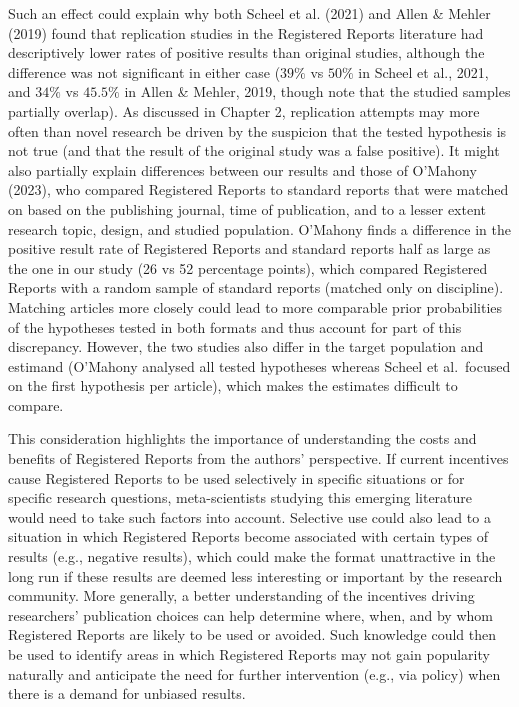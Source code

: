 \documentclass[
  british,
  a4paper,
  ,man,mask,floatsintext]{apa6}
\begin{document}
Such an effect could explain why both Scheel et al. (2021) and Allen \& Mehler (2019) found that replication studies in the Registered Reports literature had descriptively lower rates of positive results than original studies, although the difference was not significant in either case (\(39\%\) vs \(50\%\) in Scheel et al., 2021, and \(34\%\) vs \(45.5\%\) in Allen \& Mehler, 2019, though note that the studied samples partially overlap).
As discussed in Chapter 2, replication attempts may more often than novel research be driven by the suspicion that the tested hypothesis is not true (and that the result of the original study was a false positive).
It might also partially explain differences between our results and those of O'Mahony (2023), who compared Registered Reports to standard reports that were matched on based on the publishing journal, time of publication, and to a lesser extent research topic, design, and studied population.
O'Mahony finds a difference in the positive result rate of Registered Reports and standard reports half as large as the one in our study (26 vs 52 percentage points), which compared Registered Reports with a random sample of standard reports (matched only on discipline).
Matching articles more closely could lead to more comparable prior probabilities of the hypotheses tested in both formats and thus account for part of this discrepancy.
However, the two studies also differ in the target population and estimand (O'Mahony analysed all tested hypotheses whereas Scheel et al.~focused on the first hypothesis per article), which makes the estimates difficult to compare.

This consideration highlights the importance of understanding the costs and benefits of Registered Reports from the authors' perspective.
If current incentives cause Registered Reports to be used selectively in specific situations or for specific research questions, meta-scientists studying this emerging literature would need to take such factors into account.
Selective use could also lead to a situation in which Registered Reports become associated with certain types of results (e.g., negative results), which could make the format unattractive in the long run if these results are deemed less interesting or important by the research community.
More generally, a better understanding of the incentives driving researchers' publication choices can help determine where, when, and by whom Registered Reports are likely to be used or avoided.
Such knowledge could then be used to identify areas in which Registered Reports may not gain popularity naturally and anticipate the need for further intervention (e.g., via policy) when there is a demand for unbiased results.
\end{document}
